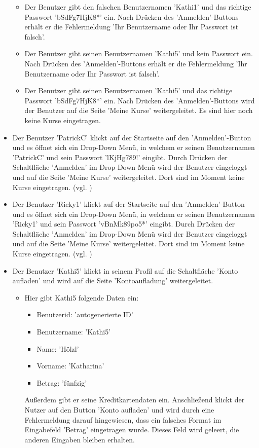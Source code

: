 \documentclass[a4paper]{scrreprt}
\begin{document}
\begin{itemize}
\begin{itemize}
				\item Der Benutzer gibt den falschen Benutzernamen 'Kathi1' und das richtige Passwort 'bSdFg7HjK8*' ein. Nach Drücken des 'Anmelden'-Buttons erhält er die Fehlermeldung 'Ihr Benutzername oder Ihr Passwort ist falsch'.
				\item Der Benutzer gibt seinen Benutzernamen 'Kathi5' und kein Passwort ein. Nach Drücken des 'Anmelden'-Buttons erhält er die Fehlermeldung 'Ihr Benutzername oder Ihr Passwort ist falsch'.
				\item Der Benutzer gibt seinen Benutzernamen 'Kathi5' und das richtige Passwort 'bSdFg7HjK8*' ein. Nach Drücken des 'Anmelden'-Buttons wird der Benutzer auf die Seite 'Meine Kurse' weitergeleitet. Es sind hier noch keine Kurse eingetragen.

			\end{itemize} 
			
			\item {} 
			Der Benutzer 'PatrickC' klickt auf der Startseite	auf den 'Anmelden'-Button und es öffnet sich ein Drop-Down Menü, in welchem er seinen Benutzernamen 'PatrickC' und sein Passwort 'lKjHg789!' eingibt. Durch Drücken der Schaltfläche 'Anmelden' im Drop-Down Menü wird der Benutzer eingeloggt und auf die Seite 'Meine Kurse' weitergeleitet. Dort sind im Moment keine Kurse eingetragen. (vgl. )
			
			\item {} 
			Der Benutzer 'Ricky1' klickt auf der Startseite	auf den 'Anmelden'-Button und es öffnet sich ein Drop-Down Menü, in welchem er seinen Benutzernamen 'Ricky1' und sein Passwort 'vBnMk89po5*' eingibt. Durch Drücken der Schaltfläche 'Anmelden' im Drop-Down Menü wird der Benutzer eingeloggt und auf die Seite 'Meine Kurse' weitergeleitet. Dort sind im Moment keine Kurse eingetragen. (vgl. )
				
			\item {} 
			Der Benutzer 'Kathi5' klickt in seinem Profil auf die Schaltfläche 'Konto aufladen' und wird auf die Seite 'Kontoaufladung' weitergeleitet. 
				\begin{itemize}
					\item Hier gibt Kathi5 folgende Daten ein:
						 \begin{itemize}
						 	\item Benutzerid: 'autogenerierte ID'
						 	\item Benutzername: 'Kathi5'
						 	\item Name: 'Hölzl'
						 	\item Vorname: 'Katharina'
						 	\item Betrag: 'fünfzig'
						 \end{itemize}
					Außerdem gibt er seine Kreditkartendaten ein. Anschließend klickt der Nutzer auf den Button 'Konto aufladen' und wird durch eine Fehlermeldung darauf hingewiesen, dass ein falsches Format im Eingabefeld 'Betrag' eingetragen wurde. Dieses Feld wird geleert, die anderen Eingaben bleiben erhalten.
						

\end{itemize}
\end{itemize}
\end{document}
